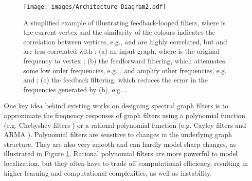 \documentclass{article}
\begin{document}
\begin{figure}[t!]
    \centering
    \texttt{[image: images/Architecture\_Diagram2.pdf]}
    \caption{A simplified example of illustrating feedback-looped filters, where  is the current vertex and the similarity of the colours indicates the correlation between vertices, e.g.,  and  are highly correlated, but  and  are less correlated with : (a) an input graph, where  is the original frequency to vertex ; (b) the feedforward filtering, which attenuates some low order frequencies, e.g. , and amplify other frequencies, e.g.  and ; (c) the feedback filtering, which reduces the error in the frequencies generated by (b), e.g. . \label{fig:firstModel}}\vspace{-0.2cm}
\end{figure}
One key idea behind existing works on designing spectral graph filters is to approximate the frequency responses of graph filters using a polynomial function (e.g. Chebyshev filters \cite{defferrard2016convolutional}) or a rational polynomial function (e.g. Cayley filters \cite{levie2017cayleynets} and ARMA \cite{bianchi2019graph}). Polynomial filters are sensitive to changes in the underlying graph structure. They are also very smooth and can hardly model sharp changes, as illustrated in Figure \ref{fig:firstModel}. Rational polynomial filters are more powerful to model localization, but they often have to trade off computational efficiency, resulting in higher learning and computational complexities, as well as instability. 
 
\end{document}
